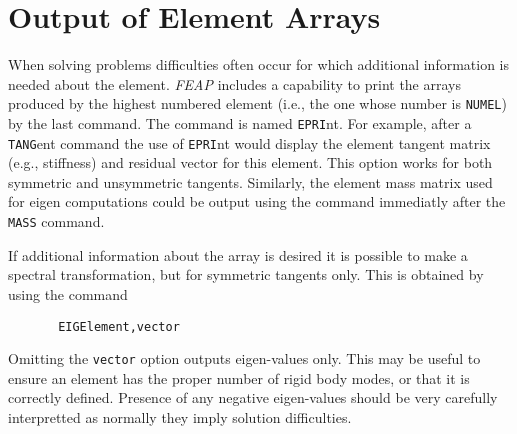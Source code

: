 \section{Output of Element Arrays}
\label{eouts}

When solving problems difficulties often occur for which additional information
is needed about the element.  {\sl FEAP} includes a capability to print the
arrays produced by the highest numbered element (i.e., the one whose number
is {\tt NUMEL}) by the last command.  The command is named {\tt EPRI}nt.
For example, after a {\tt TANG}ent command the use of {\tt EPRI}nt
would display the element tangent matrix (e.g., stiffness) and residual
vector for this element.  This option works for both symmetric and unsymmetric
tangents.  Similarly, the element mass matrix used for eigen computations
could be output using the command immediatly after the {\tt MASS} command.

If additional information about the array is desired it is possible to make
a spectral transformation, but for symmetric tangents only.  This is obtained
by using the command
\begin{verbatim}
       EIGElement,vector
\end{verbatim}
Omitting the {\tt vector} option outputs eigen-values only.
This may be useful to ensure an element has the proper number of rigid
body modes, or that it is correctly defined.  Presence of any negative
eigen-values should be very carefully interpretted as normally they imply
solution difficulties.

